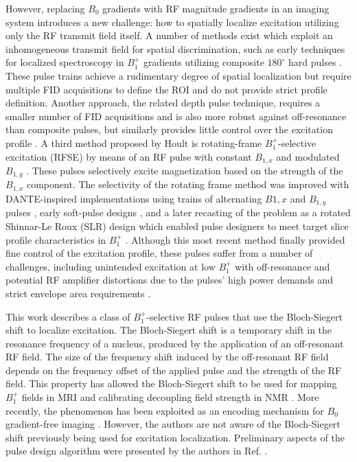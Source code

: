 \documentclass{article}
\begin{document}
\par However, replacing $B_0$ gradients with RF magnitude gradients in an imaging system introduces a new challenge: 
how to spatially localize excitation utilizing only the RF transmit field itself. 
A number of methods exist which exploit an inhomogeneous transmit field for spatial discrimination, 
such as early techniques for localized spectroscopy in $B_1^+$ gradients utilizing composite $180^\circ$ hard pulses \cite{Tycko1984SpatialInversion, Shaka1984SpatiallyPulses}. 
These pulse trains achieve a rudimentary degree of spatial localization but require multiple FID acquisitions to define the ROI and do not provide strict profile definition. 
Another approach, the related depth pulse technique, 
requires a smaller number of FID acquisitions and is also more robust against off-resonance than composite pulses, 
but similarly provides little control over the excitation profile \cite{Bendall1983DepthCoils}. 
A third method proposed by Hoult is rotating-frame $B_1^+$-selective excitation (RFSE) 
by means of an RF pulse with constant $B_{1,x}$ and modulated $B_{1,y}$ \cite{Hoult1980NMRPulses}. 
These pulses selectively excite magnetization based on the strength of the $B_{1,x}$ component. 
The selectivity of the rotating frame method was improved with DANTE-inspired implementations using trains of alternating $B{1,x}$ and $B_{1,y}$ pulses \cite{Karczmar1988ShapedSimulations,Maffei1991SliceCoil}, 
early soft-pulse designs \cite{Hedges1988TheResults}, 
and a later recasting of the problem as a rotated Shinnar-Le Roux (SLR) design which enabled 
pulse designers to meet target slice profile characteristics in $B_1^+$ \cite{Grissom2014B1+-selectiveAlgorithm}. 
Although this most recent method finally provided fine control of the excitation profile, 
these pulses suffer from a number of challenges, 
including unintended excitation at low $B_1^+$ with off-resonance and potential RF amplifier distortions due to the pulses' high power demands and strict envelope area requirements \cite{Grissom2014B1+-selectiveAlgorithm}. 

\par This work describes a class of $B_1^+$-selective RF pulses that use the Bloch-Siegert shift \cite{Bloch1940MagneticFields} to localize excitation. 
The Bloch-Siegert shift is a temporary shift in the resonance frequency of a nucleus, produced by the application of an off-resonant RF field. 
The size of the frequency shift induced by the off-resonant RF field depends on the frequency offset of the applied pulse and the strength of the RF field. 
This property has allowed the Bloch-Siegert shift to be used for mapping $B_1^+$ fields in MRI \cite{Sacolick2010B1Shift} and calibrating decoupling field strength in NMR \cite{Hosur1983AShifts,Hung2020UsingSample}. More recently, the phenomenon has been exploited as an encoding mechanism for $B_0$ gradient-free imaging \cite{Kartausch2014SpatialEffect, Zhipeng2014FrequencyShift, Wan2017PhaseTransmit}. However, the authors are not aware of the Bloch-Siegert shift previously being used for excitation localization. Preliminary aspects of the pulse design algorithm were presented by the authors in Ref. \cite{Martin2021Bloch-SiegertPulses}.
\end{document}

